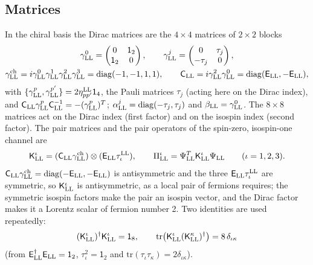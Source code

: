 \documentclass[aps,prd,onecolumn,superscriptaddress,nofootinbib,floatfix,longbibliography]{revtex4-2}
\newcommand{\LL}{{\rm LL}}
\newcommand{\tr}{\mathrm{tr}}
\begin{document}
\subsection{Matrices}

In the chiral basis the Dirac matrices are the $4\times4$ matrices of $2\times2$ blocks
\begin{gather}
\gamma^0_\LL=\begin{pmatrix}0&\mathsf 1_2\\\mathsf 1_2&0\end{pmatrix},\qquad
\gamma^j_\LL=\begin{pmatrix}0&\tau_j\\-\tau_j&0\end{pmatrix},\nonumber\\
\gamma^{\rm ch}_\LL=i\gamma^0_\LL\gamma^1_\LL\gamma^2_\LL\gamma^3_\LL={\rm diag}(-1,-1,1,1),\qquad
\mathsf C_\LL=i\gamma^2_\LL\gamma^0_\LL={\rm diag}(\mathsf E_\LL,-\mathsf E_\LL),
\label{eq:dirac}
\end{gather}
with $\{\gamma^p_\LL,\gamma^{p'}_\LL\}=2\eta^\LL_{pp'}\mathsf 1_4$, the Pauli matrices $\tau_j$ (acting here on the Dirac index), and
$\mathsf C_\LL\gamma^p_\LL\mathsf C_\LL^{-1}=-(\gamma^p_\LL)^T$; $\alpha^j_\LL={\rm diag}(-\tau_j,\tau_j)$ and $\beta_\LL=\gamma^0_\LL$. The
$8\times8$ matrices act on the Dirac index (first factor) and on the isospin index (second factor). The pair matrices and the
pair operators of the spin-zero, isospin-one channel are
\begin{equation}
\mathsf K^\iota_\LL=(\mathsf C_\LL\gamma^{\rm ch}_\LL)\otimes(\mathsf E_\LL\tau^\LL_\iota),\qquad\Pi^\iota_\LL=\Psi_\LL^T\mathsf K^\iota_\LL\Psi_\LL\qquad(\iota=1,2,3).
\label{eq:pairs}
\end{equation}
$\mathsf C_\LL\gamma^{\rm ch}_\LL={\rm diag}(-\mathsf E_\LL,-\mathsf E_\LL)$ is antisymmetric and the three $\mathsf E_\LL\tau^\LL_\iota$ are
symmetric, so $\mathsf K^\iota_\LL$ is antisymmetric, as a local pair of fermions requires; the symmetric isospin factors make the pair
an isospin vector, and the Dirac factor makes it a Lorentz scalar of fermion number 2. Two identities are used repeatedly:
\begin{equation}
(\mathsf K^\iota_\LL)^\dagger\mathsf K^\iota_\LL=\mathsf 1_8,\qquad\tr\big(\mathsf K^\iota_\LL(\mathsf K^\kappa_\LL)^\dagger\big)=8\,\delta_{\iota\kappa}
\label{eq:Kid}
\end{equation}
(from $\mathsf E_\LL^\dagger\mathsf E_\LL=\mathsf 1_2$, $\tau_\iota^2=\mathsf 1_2$ and $\tr(\tau_\iota\tau_\kappa)=2\delta_{\iota\kappa}$).
\end{document}
